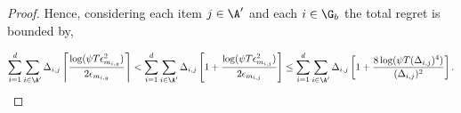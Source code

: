 \begin{proof}
Hence, considering each item $j\in\A'$ and each $i\in\G_b$ the total regret is bounded by,

\begin{align*}
\sum_{i=1}^{d}\sum_{i\in\A'}\Delta_{i,j}\left\lceil \dfrac{\log(\psi T\epsilon_{m_{i,g}}^2)}{2\epsilon_{m_{i,g}}} \right\rceil < \sum_{i=1}^{d}\sum_{i\in\A'}\Delta_{i,j}\left[ 1 + \dfrac{\log(\psi T\epsilon_{m_{i,j}}^2)}{2\epsilon_{m_{i,j}}} \right] \leq  \sum_{i=1}^{d}\sum_{i\in\A'}\Delta_{i,j}\left[ 1 + \dfrac{8\log(\psi T(\Delta_{i,j})^4)}{(\Delta_{i,j})^2}\right].
\end{align*} 


%
%

\end{proof}